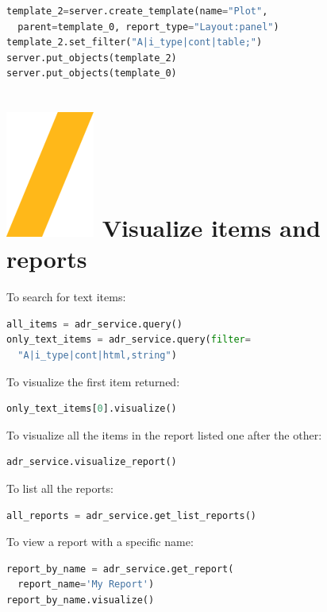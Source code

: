 \documentclass[9pt,landscape]{article}
\begin{document}
\begin{multicols}{3}
\begin{lstlisting}[language=Python]
template_2=server.create_template(name="Plot", 
  parent=template_0, report_type="Layout:panel")
template_2.set_filter("A|i_type|cont|table;")
server.put_objects(template_2)
server.put_objects(template_0)
\end{lstlisting}

\section{\includegraphics[height=\fontcharht\font`\S]{slash.png}  Visualize items and reports}
To search for text items:
\begin{lstlisting}[language=Python]
all_items = adr_service.query()
only_text_items = adr_service.query(filter=
  "A|i_type|cont|html,string")
\end{lstlisting}
To visualize the first item returned:
\begin{lstlisting}[language=Python]
only_text_items[0].visualize()
\end{lstlisting}

To visualize all the items in the report listed one after the other:
\begin{lstlisting}[language=Python]
adr_service.visualize_report()
\end{lstlisting}
To list all the reports:
\begin{lstlisting}[language=Python]
all_reports = adr_service.get_list_reports()
\end{lstlisting}
To view a report with a specific name:
\begin{lstlisting}[language=Python]
report_by_name = adr_service.get_report(
  report_name='My Report')
report_by_name.visualize()
\end{lstlisting}



\end{multicols}
\end{document}
